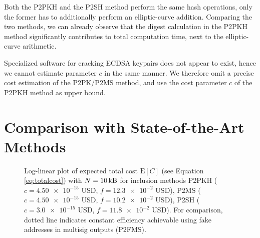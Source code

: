 \documentclass[a4paper,11pt,titlepage]{scrbook}
\begin{document}
Both the P2PKH and the P2SH method perform the same hash operations, only the former has to additionally perform an elliptic-curve addition.
Comparing the two methods, we can already observe that the digest calculation in the P2PKH method significantly contributes to total computation time, next to the elliptic-curve arithmetic.

Specialized software for cracking ECDSA keypairs does not appear to exist, hence we cannot estimate parameter $c$ in the same manner.
We therefore omit a precise cost estimation of the P2PK/P2MS method, and use the cost parameter $c$ of the P2PKH method as upper bound.

\section{Comparison with State-of-the-Art Methods}\label{sec:comparison}

\begin{figure}[tb]
    \centering
    \caption[Log-linear plot of expected total cost]{Log-linear plot of expected total cost $\mathrm{E}[C]$ (see Equation \ref{eq:totalcost}) with $N=\protect\SI{10}{\kilo\byte}$ for inclusion methods P2PKH ($c=\num{4.50e-15}$ USD, $f=\num{12.3e-2}$ USD), P2MS ($c=\num{4.50e-15}$ USD, $f=\num{10.2e-2}$ USD), P2SH ($c=\num{3.0e-15}$ USD, $f=\num{11.8e-2}$ USD). For comparison, dotted line indicates constant efficiency achievable using fake addresses in multisig outputs (P2FMS).}
    \label{fig:plot}
\end{figure}
\end{document}
